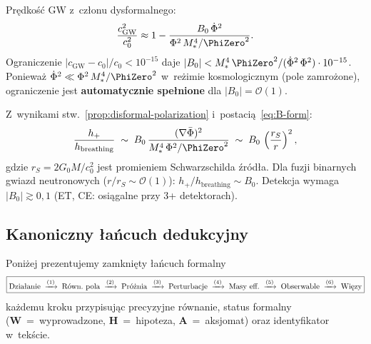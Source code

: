 \begin{remark}[Ograniczenie GW170817 na $B_0$]\label{rem:B0-bound}
Pr\k{e}dko\'s\'c GW z~cz\l{}onu dysformalnego:
\begin{equation}
  \frac{c_{\mathrm{GW}}^2}{c_0^2}
  \approx 1 - \frac{B_0\,\dot\Phi^2}{\Phi^2\,M_*^4/\PhiZero^2}.
\end{equation}
Ograniczenie $|c_{\mathrm{GW}} - c_0|/c_0 < 10^{-15}$ daje
$|B_0| < M_*^4\,\PhiZero^2/(\dot\Phi^2\,\Phi^2) \cdot 10^{-15}$.
Poniewa\.z $\dot\Phi^2 \ll \Phi^2\,M_*^4/\PhiZero^2$ w~re\.zimie
kosmologicznym (pole zamro\.zone), ograniczenie jest
\textbf{automatycznie spe\l{}nione} dla $|B_0| = \mathcal{O}(1)$.
\end{remark}

\begin{remark}\label{rem:h-ratio}
Z~wynikami stw.~\ref{prop:disformal-polarization}
i~postaci\k{a}~\eqref{eq:B-form}:
\begin{equation}\label{eq:h-ratio}
  \frac{h_+}{h_{\mathrm{breathing}}}
  \;\sim\; B_0\,\frac{(\nabla\bar\Phi)^2}
  {M_*^4\,\Phi^2/\PhiZero^2}
  \;\sim\; B_0\,\left(\frac{r_S}{r}\right)^2,
\end{equation}
gdzie $r_S = 2G_0 M/c_0^2$ jest promieniem Schwarzschilda
\'zr\'od\l{}a. Dla fuzji binarnych gwiazd neutronowych
($r/r_S \sim \mathcal{O}(1)$):
$h_+/h_{\mathrm{breathing}} \sim B_0$.
Detekcja wymaga $|B_0| \gtrsim 0{,}1$
(ET, CE: osi\k{a}galne przy 3+ detektorach).
\end{remark}

\subsection{Kanoniczny \l{}a\'ncuch dedukcyjny}\label{ssec:lancuch}

Poni\.zej prezentujemy zamkni\k{e}ty \l{}a\'ncuch formalny
\[
  \boxed{
  \text{Dzia\l{}anie}
  \;\xrightarrow{(1)}\;
  \text{R\'own.\ pola}
  \;\xrightarrow{(2)}\;
  \text{Pr\'o\.znia}
  \;\xrightarrow{(3)}\;
  \text{Perturbacje}
  \;\xrightarrow{(4)}\;
  \text{Masy eff.}
  \;\xrightarrow{(5)}\;
  \text{Obserwable}
  \;\xrightarrow{(6)}\;
  \text{Wi\k{e}zy}
  }
\]
ka\.zdemu kroku przypisuj\k{a}c precyzyjne r\'ownanie, status
formalny ({\bfseries W}~=~wyprowadzone, {\bfseries H}~=~hipoteza,
{\bfseries A}~=~aksjomat) oraz identyfikator w~tek\'scie.

